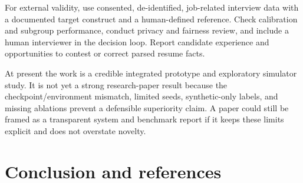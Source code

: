 \documentclass{ieeeaccess}
\begin{document}
For external validity, use consented, de-identified, job-related interview data with a documented target construct and a human-defined reference. Check calibration and subgroup performance, conduct privacy and fairness review, and include a human interviewer in the decision loop. Report candidate experience and opportunities to contest or correct parsed resume facts.

At present the work is a credible integrated prototype and exploratory simulator study. It is not yet a strong research-paper result because the checkpoint/environment mismatch, limited seeds, synthetic-only labels, and missing ablations prevent a defensible superiority claim. A paper could still be framed as a transparent system and benchmark report if it keeps these limits explicit and does not overstate novelty.

\begin{table}[t]\centering\small

\caption{Table 11. Priority experiments}


\end{table}

\section{Conclusion and references}
\end{document}
